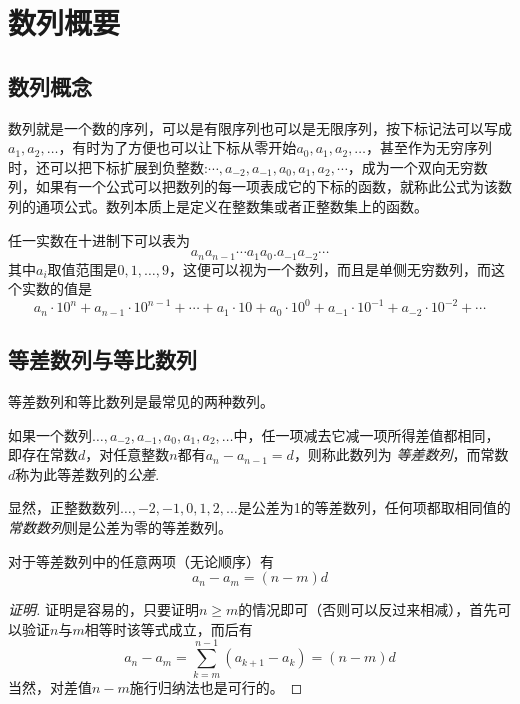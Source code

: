 
\section{数列概要}
\label{sec:number-sequence-general}

\subsection{数列概念}

数列就是一个数的序列，可以是有限序列也可以是无限序列，按下标记法可以写成$a_1,a_2,\ldots$，有时为了方便也可以让下标从零开始$a_0,a_1,a_2,\ldots$，甚至作为无穷序列时，还可以把下标扩展到负整数:$\cdots,a_{-2},a_{-1},a_0,a_1,a_2,\cdots$，成为一个双向无穷数列，如果有一个公式可以把数列的每一项表成它的下标的函数，就称此公式为该数列的通项公式。数列本质上是定义在整数集或者正整数集上的函数。

\begin{example}
  任一实数在十进制下可以表为
  \[ a_na_{n-1}\cdots a_1a_0.a_{-1}a_{-2}\cdots \]
  其中$a_i$取值范围是$0,1,\ldots,9$，这便可以视为一个数列，而且是单侧无穷数列，而这个实数的值是
  \[ a_n\cdot 10^n + a_{n-1} \cdot 10^{n-1} + \cdots + a_1 \cdot 10 + a_0 \cdot 10^0 + a_{-1} \cdot 10^{-1} + a_{-2} \cdot 10^{-2} +\cdots \]
\end{example}

\subsection{等差数列与等比数列}

等差数列和等比数列是最常见的两种数列。

\begin{definition}
 如果一个数列$\ldots,a_{-2},a_{-1},a_0,a_1,a_2,\ldots$中，任一项减去它减一项所得差值都相同，即存在常数$d$，对任意整数$n$都有$a_n-a_{n-1}=d$，则称此数列为 \emph{等差数列}，而常数$d$称为此等差数列的\emph{公差}.
\end{definition}

显然，正整数数列$\ldots,-2,-1,0,1,2,\ldots$是公差为1的等差数列，任何项都取相同值的\emph{常数数列}则是公差为零的等差数列。

\begin{theorem}
对于等差数列中的任意两项（无论顺序）有
\[ a_n-a_m=(n-m)d \]
\end{theorem}

\begin{proof}[证明]
证明是容易的，只要证明$n\geqslant m$的情况即可（否则可以反过来相减），首先可以验证$n$与$m$相等时该等式成立，而后有
\[ a_n-a_m=\sum_{k=m}^{n-1}(a_{k+1}-a_k)=(n-m)d \]
当然，对差值$n-m$施行归纳法也是可行的。
\end{proof}

